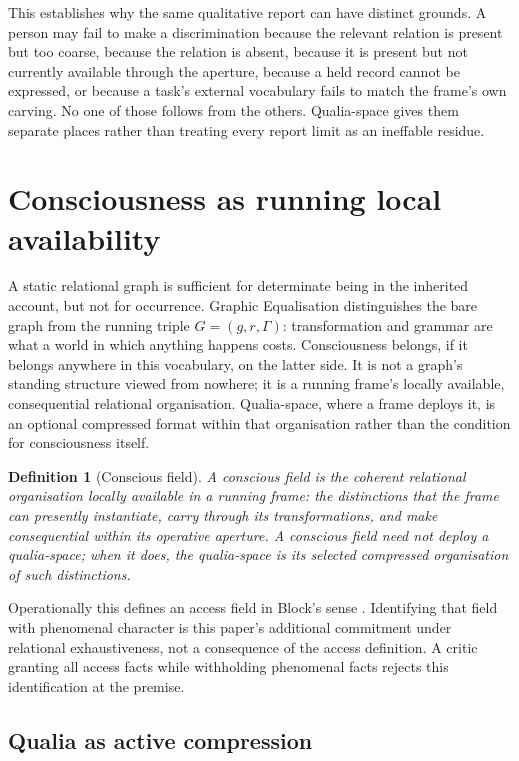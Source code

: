 \documentclass[11pt,a4paper]{article}
\newtheorem{definition}{Definition}[section]
\theoremstyle{remark}\newtheorem{remark}[definition]{Remark}
\begin{document}
This establishes why the same qualitative report can have distinct grounds. A
person may fail to make a discrimination because the relevant relation is present
but too coarse, because the relation is absent, because it is present but not
currently available through the aperture, because a held record cannot be
expressed, or because a task's external vocabulary fails to match the frame's own
carving. No one of those follows from the others. Qualia-space gives them separate
places rather than treating every report limit as an ineffable residue.

\section{Consciousness as running local availability}\label{sec:consciousness}

A static relational graph is sufficient for determinate being in the inherited
account, but not for occurrence. Graphic Equalisation distinguishes the bare graph
from the running triple $G=(g,r,\Gamma)$: transformation and grammar are what a
world in which anything happens costs. Consciousness belongs, if it belongs
anywhere in this vocabulary, on the latter side. It is not a graph's standing
structure viewed from nowhere; it is a running frame's locally available,
consequential relational organisation. Qualia-space, where a frame deploys it, is
an optional compressed format within that organisation rather than the condition
for consciousness itself.

\begin{definition}[Conscious field]\label{def:conscious-field}
A \emph{conscious field} is the coherent relational organisation locally available
in a running frame: the distinctions that the frame can presently instantiate,
carry through its transformations, and make consequential within its operative
aperture. A conscious field need not deploy a qualia-space; when it does, the
qualia-space is its selected compressed organisation of such distinctions.
\end{definition}
Operationally this defines an access field in Block's sense
\cite{block1995}. Identifying that field with phenomenal character is this
paper's additional commitment under relational exhaustiveness, not a
consequence of the access definition. A critic granting all access facts
while withholding phenomenal facts rejects this identification at the premise.



\subsection{Qualia as active compression}\label{sec:qualia-as-compression}
\end{document}
